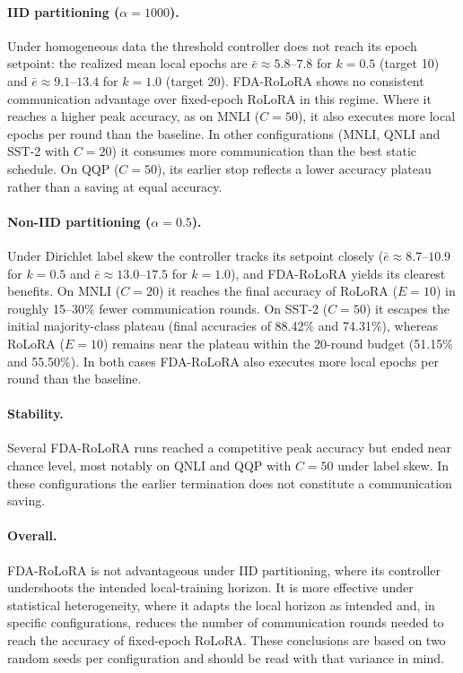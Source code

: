 \paragraph{IID partitioning ($\alpha = 1000$).}
Under homogeneous data the threshold controller does not reach its epoch setpoint: the realized mean local epochs are $\bar{e} \approx 5.8$--$7.8$ for $k = 0.5$ (target 10) and $\bar{e} \approx 9.1$--$13.4$ for $k = 1.0$ (target 20). FDA-RoLoRA shows no consistent communication advantage over fixed-epoch RoLoRA in this regime. Where it reaches a higher peak accuracy, as on MNLI ($C = 50$), it also executes more local epochs per round than the baseline. In other configurations (MNLI, QNLI and SST-2 with $C = 20$) it consumes more communication than the best static schedule. On QQP ($C = 50$), its earlier stop reflects a lower accuracy plateau rather than a saving at equal accuracy.

\paragraph{Non-IID partitioning ($\alpha = 0.5$).}
Under Dirichlet label skew the controller tracks its setpoint closely ($\bar{e} \approx 8.7$--$10.9$ for $k = 0.5$ and $\bar{e} \approx 13.0$--$17.5$ for $k = 1.0$), and FDA-RoLoRA yields its clearest benefits. On MNLI ($C = 20$) it reaches the final accuracy of RoLoRA ($E = 10$) in roughly 15--30\% fewer communication rounds. On SST-2 ($C = 50$) it escapes the initial majority-class plateau (final accuracies of 88.42\% and 74.31\%), whereas RoLoRA ($E = 10$) remains near the plateau within the 20-round budget (51.15\% and 55.50\%). In both cases FDA-RoLoRA also executes more local epochs per round than the baseline.

\paragraph{Stability.}
Several FDA-RoLoRA runs reached a competitive peak accuracy but ended near chance level, most notably on QNLI and QQP with $C = 50$ under label skew. In these configurations the earlier termination does not constitute a communication saving.

\paragraph{Overall.}
FDA-RoLoRA is not advantageous under IID partitioning, where its controller undershoots the intended local-training horizon. It is more effective under statistical heterogeneity, where it adapts the local horizon as intended and, in specific configurations, reduces the number of communication rounds needed to reach the accuracy of fixed-epoch RoLoRA. These conclusions are based on two random seeds per configuration and should be read with that variance in mind.

\clearpage
